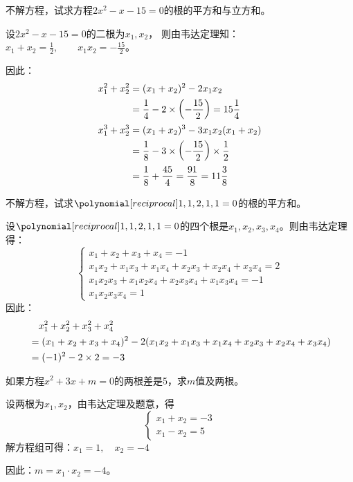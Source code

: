 \begin{example}
    不解方程，试求方程$2x^2-x-15=0$的根的平方和与立方和。
\end{example}


\begin{solution}
    设$2x^2-x-15=0$的二根为$x_1,x_2$，
    则由韦达定理知：$x_1+x_2=\frac{1}{2},\qquad x_1x_2=-\frac{15}{2}$。

    因此：
\[\begin{split}
   x^2_1+x^2_2&=(x_1+x_2)^2-2x_1x_2\\ 
    &=\dfrac{1}{4}-2\times\left(-\dfrac{15}{2}\right)
    =15\dfrac{1}{4}\\
x^3_1+x^3_2&=(x_1+x_2)^3-3x_1x_2(x_1+x_2)\\
&=\dfrac{1}{8}-3\times\left(-\dfrac{15}{2}\right)\times\dfrac{1}{2}\\
&=\dfrac{1}{8}+\dfrac{45}{4}=\dfrac{91}{8}=11\dfrac{3}{8}    
\end{split}\]

\end{solution}


\begin{example}
不解方程，试求$\poly{1,1,2,1,1}=0$的根的平方和。
\end{example}

\begin{solution}
 设$\poly{1,1,2,1,1}=0$的四个根是$x_1,x_2,x_3,x_4$。则由韦达定理得：
\[\begin{cases}
  x_1+x_2+x_3+x_4=-1\\
  x_1x_2+x_1x_3+x_1x_4+x_2x_3+x_2x_4+x_3x_4=2\\
  x_1x_2x_3+x_1x_2x_4+x_2x_3x_4+x_1x_3x_4=-1\\
  x_1x_2x_3x_4=1  
\end{cases}\]
因此：
\[\begin{split}
  &\quad  x^2_1+x_2^2+x_3^2+x_4^2\\
&=(x_1+x_2+x_3+x_4)^2-2(x_1x_2+x_1x_3+x_1x_4+x_2x_3+x_2x_4+x_3x_4)\\
&=(-1)^2-2\times 2=-3
\end{split}\]
\end{solution}

\begin{example}
如果方程$x^2+3x+m=0$的两根差是5，求$m$值及两根。
\end{example}

\begin{solution}
    设两根为$x_1,x_2$，由韦达定理及题意，得
\[\begin{cases}
    x_1+x_2=-3\\
    x_1-x_2=5
\end{cases}\]
解方程组可得：$x_1=1,\quad x_2=-4$

因此：$m=x_1\cdot x_2=-4$。
\end{solution}

